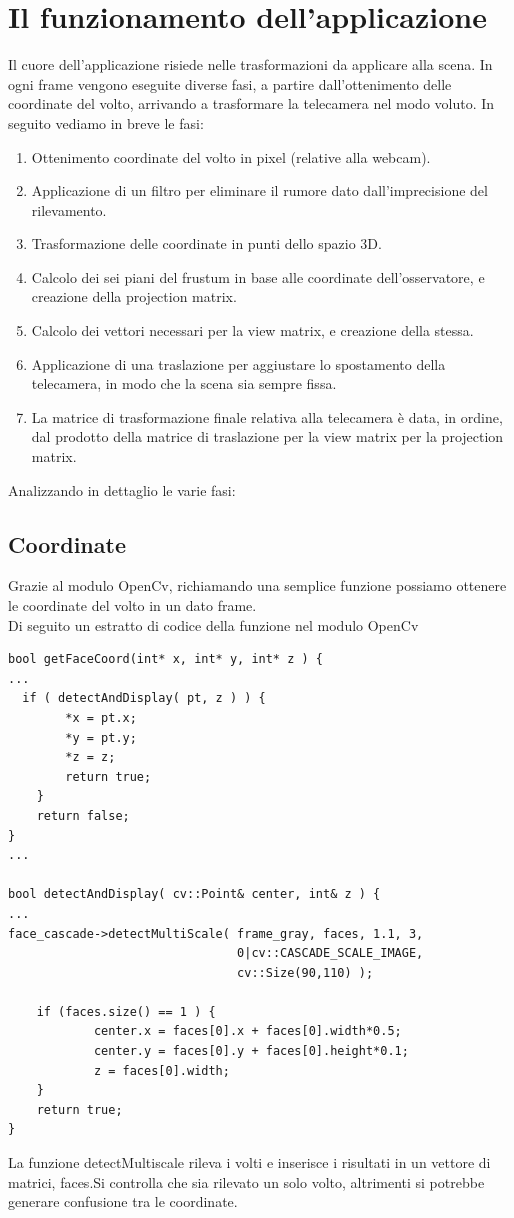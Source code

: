 \section{Il funzionamento dell'applicazione}
Il cuore dell'applicazione risiede nelle trasformazioni da applicare alla scena. In ogni frame vengono eseguite diverse fasi, a partire dall'ottenimento delle coordinate del volto, arrivando a trasformare la telecamera nel modo voluto. In seguito vediamo in breve le fasi:
\begin{enumerate}
\item Ottenimento coordinate del volto in pixel (relative alla webcam).
\item Applicazione di un filtro per eliminare il rumore dato dall'imprecisione del rilevamento.
\item Trasformazione delle coordinate in punti dello spazio 3D.
\item Calcolo dei sei piani del frustum in base alle coordinate dell'osservatore, e creazione della projection matrix.
\item Calcolo dei vettori necessari per la view matrix, e creazione della stessa.
\item Applicazione di una traslazione per aggiustare lo spostamento della telecamera, in modo che la scena sia sempre fissa.
\item La matrice di trasformazione finale relativa alla telecamera è data, in ordine, dal prodotto della matrice di traslazione per la view matrix per la projection matrix.
\end{enumerate}
Analizzando in dettaglio le varie fasi:

\subsection{Coordinate}

Grazie al modulo OpenCv, richiamando una semplice funzione possiamo ottenere le coordinate del volto in un dato frame.\\

Di seguito un estratto di codice della funzione nel modulo OpenCv
\begin{lstlisting}
bool getFaceCoord(int* x, int* y, int* z ) {
...
  if ( detectAndDisplay( pt, z ) ) {
        *x = pt.x;
        *y = pt.y;
        *z = z;
        return true;
    } 
    return false;
}
...

bool detectAndDisplay( cv::Point& center, int& z ) {
...
face_cascade->detectMultiScale( frame_gray, faces, 1.1, 3,
                                0|cv::CASCADE_SCALE_IMAGE, 
                                cv::Size(90,110) );
    
    if (faces.size() == 1 ) { 
            center.x = faces[0].x + faces[0].width*0.5;
            center.y = faces[0].y + faces[0].height*0.1;
            z = faces[0].width;
    }
    return true;
}
\end{lstlisting}
La funzione detectMultiscale rileva i volti e inserisce i risultati in un vettore di matrici, faces.Si controlla che sia rilevato un solo volto, altrimenti si potrebbe generare confusione tra le coordinate.

